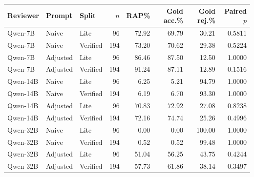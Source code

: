 \begin{tabular}{lllrrrrr}
\toprule
Reviewer & Prompt & Split & $n$ & RAP\% & Gold acc.\% & Gold rej.\% & Paired $p$ \\
\midrule
Qwen-7B & Naive & Lite & 96 & 72.92 & 69.79 & 30.21 & 0.5811 \\
Qwen-7B & Naive & Verified & 194 & 73.20 & 70.62 & 29.38 & 0.5224 \\
Qwen-7B & Adjusted & Lite & 96 & 86.46 & 87.50 & 12.50 & 1.0000 \\
Qwen-7B & Adjusted & Verified & 194 & 91.24 & 87.11 & 12.89 & 0.1516 \\
Qwen-14B & Naive & Lite & 96 & 6.25 & 5.21 & 94.79 & 1.0000 \\
Qwen-14B & Naive & Verified & 194 & 6.19 & 6.70 & 93.30 & 1.0000 \\
Qwen-14B & Adjusted & Lite & 96 & 70.83 & 72.92 & 27.08 & 0.8238 \\
Qwen-14B & Adjusted & Verified & 194 & 72.16 & 74.74 & 25.26 & 0.4996 \\
Qwen-32B & Naive & Lite & 96 & 0.00 & 0.00 & 100.00 & 1.0000 \\
Qwen-32B & Naive & Verified & 194 & 0.52 & 0.52 & 99.48 & 1.0000 \\
Qwen-32B & Adjusted & Lite & 96 & 51.04 & 56.25 & 43.75 & 0.4244 \\
Qwen-32B & Adjusted & Verified & 194 & 57.73 & 61.86 & 38.14 & 0.3497 \\
\bottomrule
\end{tabular}
